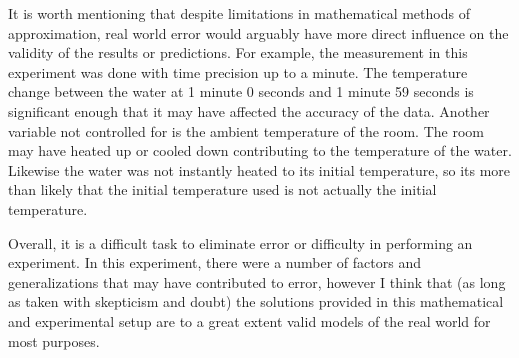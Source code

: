 \documentclass[10pt]{article}
\begin{document}
It is worth mentioning that despite limitations in mathematical methods of approximation, real world error would arguably have more direct influence on the validity of the results or predictions. For example, the measurement in this experiment was done with time precision up to a minute. The temperature change between the water at 1 minute 0 seconds and 1 minute 59 seconds is significant enough that it may have affected the accuracy of the data. Another variable not controlled for is the ambient temperature of the room. The room may have heated up or cooled down contributing to the temperature of the water. Likewise the water was not instantly heated to its initial temperature, so its more than likely that the initial temperature used is not actually the initial temperature.

Overall, it is a difficult task to eliminate error or difficulty in performing an experiment. In this experiment, there were a number of factors and generalizations that may have contributed to error, however I think that (as long as taken with skepticism and doubt) the solutions provided in this mathematical and experimental setup are to a great extent valid models of the real world for most purposes.
\end{document}
